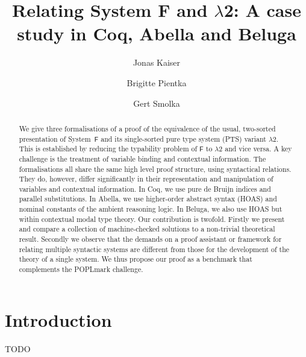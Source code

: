 \documentclass[a4paper,UKenglish]{lipics-v2016}
\title{Relating System F and $\lambda$2: A case study in Coq, Abella and Beluga}
\author[1]{Jonas Kaiser}
\author[2]{Brigitte Pientka}
\author[1]{Gert Smolka}
\affil[1]{Saarland University, Saarbrücken, Germany\\
  \texttt{[jkaiser,smolka]}@ps.uni-saarland.de}}
\affil[2]{school, city, country\\
  \texttt{MAIL}}
\newcommand{\SysF}{\ensuremath{\mathsf{F}}\xspace}
\newcommand{\SysL}{$\lambda$2\xspace}
\begin{document}
\maketitle

\begin{abstract}
  We give three formalisations of a proof of the equivalence of the usual, two-sorted presentation of System~\SysF and its single-sorted pure type system (PTS) variant \SysL.
  This is established by reducing the typability problem of \SysF to \SysL and vice versa.
  A key challenge is the treatment of variable binding and contextual information.
  The formalisations all share the same high level proof structure, using syntactical relations.
  They do, however, differ significantly in their representation and manipulation of variables and contextual information.
  In Coq, we use pure de Bruijn indices and parallel substitutions.
  In Abella, we use higher-order abstract syntax (HOAS) and nominal constants of the ambient reasoning logic.
  In Beluga, we also use HOAS but within contextual modal type theory.
  Our contribution is twofold.
  Firstly we present and compare a collection of machine-checked solutions to a non-trivial theoretical result.
  Secondly we observe that the demands on a proof assistant or framework for relating multiple syntactic systems are different from those for the development of the theory of a single system.
  We thus propose our proof as a benchmark that complements the POPLmark challenge.
\end{abstract}

\section{Introduction}

TODO
\end{document}

